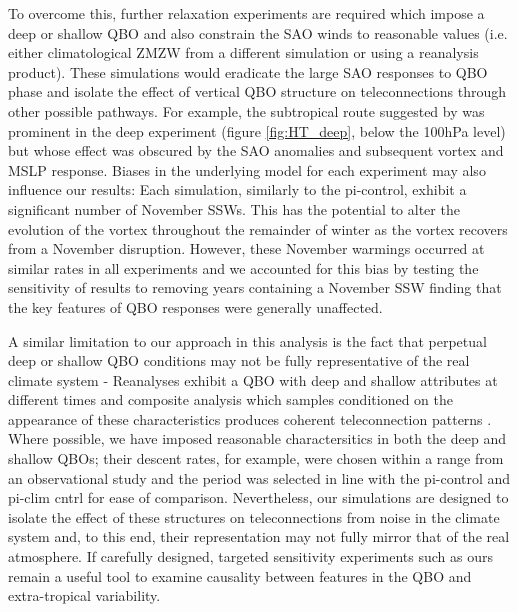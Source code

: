 To overcome this, further relaxation experiments are required which impose a deep or shallow QBO and also constrain the SAO winds to reasonable values (i.e. either climatological ZMZW from a different simulation or using a reanalysis product). These simulations would eradicate the large SAO responses to QBO phase and isolate the effect of vertical QBO structure on teleconnections through other possible pathways. For example, the subtropical route suggested by \cite{graySurface2018b} was prominent in the deep experiment (figure \ref{fig:HT_deep}, below the 100hPa level) but whose effect was obscured by the SAO anomalies and subsequent vortex and MSLP response. Biases in the underlying model for each experiment may also influence our results: Each simulation, similarly to the pi-control, exhibit a significant number of November SSWs. This has the potential to alter the evolution of the vortex throughout the remainder of winter as the vortex recovers from a November disruption. However, these November warmings occurred at similar rates in all experiments and we accounted for this bias by testing the sensitivity of results to removing years containing a November SSW finding that the key features of QBO responses were generally unaffected.

A similar limitation to our approach in this analysis is the fact that perpetual deep or shallow QBO conditions may not be fully representative of the real climate system - Reanalyses exhibit a QBO with deep and shallow attributes at different times and composite analysis which samples conditioned on the appearance of these characteristics produces coherent teleconnection patterns \citep{andrewsObserved2019d}. Where possible, we have imposed reasonable charactersitics in both the deep and shallow QBOs; their descent rates, for example, were chosen within a range from an observational study \citep{kinnersleyDescent1996} and the period was selected in line with the pi-control and pi-clim cntrl for ease of comparison. Nevertheless, our simulations are designed to isolate the effect of these structures on teleconnections from noise in the climate system and, to this end, their representation may not fully mirror that of the real atmosphere. If carefully designed, targeted sensitivity experiments such as ours remain a useful tool to examine causality between features in the QBO and extra-tropical variability.
